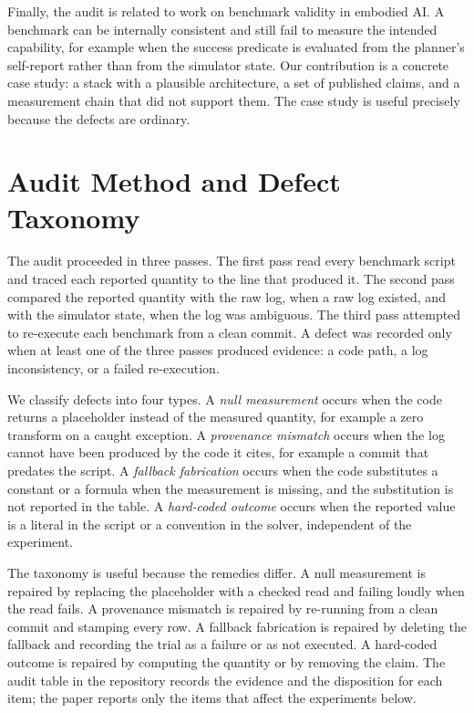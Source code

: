 \documentclass[journal]{IEEEtran}
\begin{document}
Finally, the audit is related to work on benchmark validity in embodied AI. A benchmark can be internally consistent and still fail to measure the intended capability, for example when the success predicate is evaluated from the planner's self-report rather than from the simulator state. Our contribution is a concrete case study: a stack with a plausible architecture, a set of published claims, and a measurement chain that did not support them. The case study is useful precisely because the defects are ordinary.

\section{Audit Method and Defect Taxonomy}
\label{sec:audit}
The audit proceeded in three passes. The first pass read every benchmark script and traced each reported quantity to the line that produced it. The second pass compared the reported quantity with the raw log, when a raw log existed, and with the simulator state, when the log was ambiguous. The third pass attempted to re-execute each benchmark from a clean commit. A defect was recorded only when at least one of the three passes produced evidence: a code path, a log inconsistency, or a failed re-execution.

We classify defects into four types. A \emph{null measurement} occurs when the code returns a placeholder instead of the measured quantity, for example a zero transform on a caught exception. A \emph{provenance mismatch} occurs when the log cannot have been produced by the code it cites, for example a commit that predates the script. A \emph{fallback fabrication} occurs when the code substitutes a constant or a formula when the measurement is missing, and the substitution is not reported in the table. A \emph{hard-coded outcome} occurs when the reported value is a literal in the script or a convention in the solver, independent of the experiment.

The taxonomy is useful because the remedies differ. A null measurement is repaired by replacing the placeholder with a checked read and failing loudly when the read fails. A provenance mismatch is repaired by re-running from a clean commit and stamping every row. A fallback fabrication is repaired by deleting the fallback and recording the trial as a failure or as not executed. A hard-coded outcome is repaired by computing the quantity or by removing the claim. The audit table in the repository records the evidence and the disposition for each item; the paper reports only the items that affect the experiments below.
\end{document}
